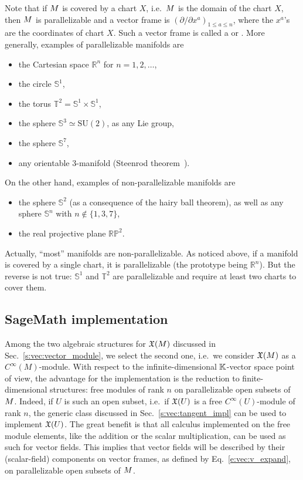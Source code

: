 Note that if $M$ is covered by a chart $X$, i.e.~$M$ is the domain of
the chart $X$, then $M$ is parallelizable and a vector frame
is $(\partial/\partial x^a)_{1\leq a \leq n}$, where the $x^a$'s are
the coordinates of chart $X$. Such a vector frame is called a
 or . More generally, examples of parallelizable manifolds are
\cite{Lee13}
\begin{itemize}
\item the Cartesian space $\mathbb{R}^n$ for $n=1,2,\ldots$,
\item the circle $\mathbb{S}^1$,
\item the torus $\mathbb{T}^2 = \mathbb{S}^1\times \mathbb{S}^1$,
\item the sphere $\mathbb{S}^3 \simeq \mathrm{SU}(2)$, as any Lie group,
\item the sphere $\mathbb{S}^7$,
\item any orientable 3-manifold (Steenrod theorem~\cite{Steen51}).
\end{itemize}
On the other hand, examples of non-parallelizable manifolds are
\begin{itemize}
\item the sphere $\mathbb{S}^2$ (as a consequence of the hairy ball theorem),
as well as any sphere $\mathbb{S}^n$ with $n\not\in\{1,3,7\}$,
\item the real projective plane $\mathbb{RP}^2$.
\end{itemize}
Actually, ``most'' manifolds are non-parallelizable.
As noticed above, if a manifold is covered by a single chart, it is
parallelizable (the prototype being $\mathbb{R}^n$). But the reverse is not
true: $\mathbb{S}^1$ and $\mathbb{T}^2$ are parallelizable and require
at least two charts to cover them.

\subsection{SageMath implementation} \label{s:vec:vector_field_impl}

Among the two algebraic structures for $\mathfrak{X}(M)$ discussed in Sec.~\ref{s:vec:vector_module},
we select the second one, i.e.\ we consider $\mathfrak{X}(M)$ as a $C^\infty(M)$-module.
With respect to the infinite-dimensional $\mathbb{K}$-vector space point of view,
the advantage for the implementation is the reduction to finite-dimensional structures: free modules of rank $n$ on parallelizable open subsets of $M$.
Indeed, if $U$ is such an open subset, i.e.\ if $\mathfrak{X}(U)$ is a free $C^\infty(U)$-module
of rank $n$, the generic class  discussed in
Sec.~\ref{s:vec:tangent_impl} can be used to implement $\mathfrak{X}(U)$. The great benefit
is that all calculus implemented on the free module elements, like the addition
or the scalar multiplication, can be used as such for vector fields.
This implies that vector fields will be described by their (scalar-field) components
on vector frames, as defined by Eq.~\eqref{e:vec:v_expand}, on parallelizable
open subsets of $M$.

